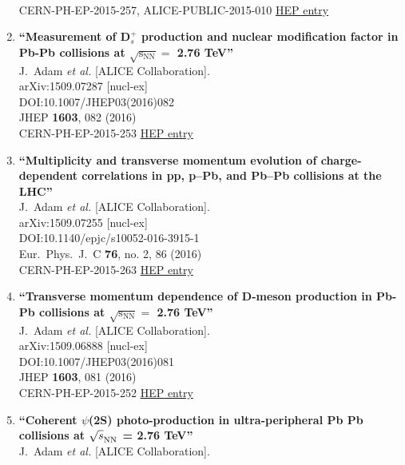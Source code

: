 \begin{enumerate}
  \\{}CERN-PH-EP-2015-257, ALICE-PUBLIC-2015-010
\href{http://inspirehep.net/record/1394676}{HEP entry}
\item%
{\bf ``Measurement of D$_{s}^{+}$ production and nuclear modification factor in Pb-Pb collisions at $ \sqrt{{\mathrm{s}}_{\mathrm{NN}}}=$ 2.76 TeV''}
  \\{}J.~Adam {\it et al.} [ALICE Collaboration].
  \\{}arXiv:1509.07287 [nucl-ex]
  \\{}DOI:10.1007/JHEP03(2016)082
  \\{}JHEP {\bf 1603}, 082 (2016)
  \\{}CERN-PH-EP-2015-253
\href{http://inspirehep.net/record/1394675}{HEP entry}
\item%
{\bf ``Multiplicity and transverse momentum evolution of charge-dependent correlations in pp, p–Pb, and Pb–Pb collisions at the LHC''}
  \\{}J.~Adam {\it et al.} [ALICE Collaboration].
  \\{}arXiv:1509.07255 [nucl-ex]
  \\{}DOI:10.1140/epjc/s10052-016-3915-1
  \\{}Eur.\ Phys.\ J.\ C {\bf 76}, no. 2, 86 (2016)
  \\{}CERN-PH-EP-2015-263
\href{http://inspirehep.net/record/1394672}{HEP entry}
\item%
{\bf ``Transverse momentum dependence of D-meson production in Pb-Pb collisions at $ \sqrt{{\mathrm{s}}_{\mathrm{NN}}}=$ 2.76  TeV''}
  \\{}J.~Adam {\it et al.} [ALICE Collaboration].
  \\{}arXiv:1509.06888 [nucl-ex]
  \\{}DOI:10.1007/JHEP03(2016)081
  \\{}JHEP {\bf 1603}, 081 (2016)
  \\{}CERN-PH-EP-2015-252
\href{http://inspirehep.net/record/1394580}{HEP entry}
\item%
{\bf ``Coherent $\psi$(2S) photo-production in ultra-peripheral Pb Pb collisions at $\sqrt{s}_{\rm NN}$ = 2.76 TeV''}
  \\{}J.~Adam {\it et al.} [ALICE Collaboration].

\end{enumerate}
